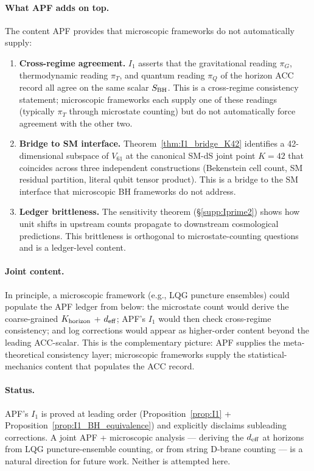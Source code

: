 \documentclass[11pt]{article}
\theoremstyle{plain}
\theoremstyle{definition}
\theoremstyle{remark}
\begin{document}
\paragraph{What APF adds on top.}  The content APF provides that microscopic frameworks do not automatically supply:
\begin{enumerate}[leftmargin=2.5em,itemsep=3pt]
  \item \textbf{Cross-regime agreement.}  $I_1$ asserts that the gravitational reading $\pi_G$, thermodynamic reading $\pi_T$, and quantum reading $\pi_Q$ of the horizon ACC record all agree on the same scalar $S_{\rm BH}$.  This is a cross-regime consistency statement; microscopic frameworks each supply one of these readings (typically $\pi_T$ through microstate counting) but do not automatically force agreement with the other two.
  \item \textbf{Bridge to SM interface.}  Theorem~\ref{thm:I1_bridge_K42} identifies a 42-dimensional subspace of $V_{61}$ at the canonical SM-dS joint point $K = 42$ that coincides across three independent constructions (Bekenstein cell count, SM residual partition, literal qubit tensor product).  This is a bridge to the SM interface that microscopic BH frameworks do not address.
  \item \textbf{Ledger brittleness.}  The sensitivity theorem (\S\ref{supp:Iprime2}) shows how unit shifts in upstream counts propagate to downstream cosmological predictions.  This brittleness is orthogonal to microstate-counting questions and is a ledger-level content.
\end{enumerate}

\paragraph{Joint content.}  In principle, a microscopic framework (e.g., LQG puncture ensembles) could populate the APF ledger from below: the microstate count would derive the coarse-grained $K_{\rm horizon}$ + $d_{\rm eff}$; APF's $I_1$ would then check cross-regime consistency; and log corrections would appear as higher-order content beyond the leading ACC-scalar.  This is the complementary picture: APF supplies the meta-theoretical consistency layer; microscopic frameworks supply the statistical-mechanics content that populates the ACC record.

\paragraph{Status.}  APF's $I_1$ is proved at leading order (Proposition~\ref{prop:I1} + Proposition~\ref{prop:I1_BH_equivalence}) and explicitly disclaims subleading corrections.  A joint APF + microscopic analysis --- deriving the $d_{\rm eff}$ at horizons from LQG puncture-ensemble counting, or from string D-brane counting --- is a natural direction for future work.  Neither is attempted here.
\end{document}
